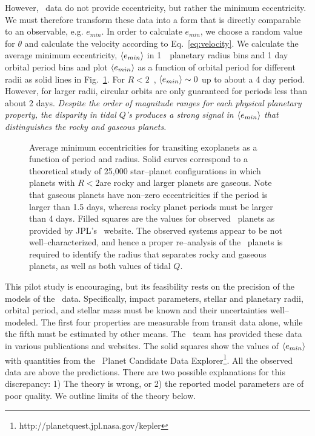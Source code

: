However, \kepler~data do not provide eccentricity, but rather the
minimum eccentricity. We must therefore transform these data into a
form that is directly comparable to an observable, e.g. $e_{min}$. In
order to calculate $e_{min}$, we choose a random value for $\theta$
and calculate the velocity according to Eq.~\ref{eq:velocity}. We
calculate the average minimum eccentricity, $\left< e_{min} \right>$ in
1~\rearth~planetary radius bins and 1 day orbital period bins and plot
$\left< e_{min} \right>$ as a function of orbital period for different radii as
solid lines in Fig.~\ref{fig:emin}. For $R < 2$~\rearth, $\left< e_{min} \right>
\sim 0$ up to about a 4 day period. However, for larger radii,
circular orbits are only guaranteed for periods less than about 2
days. \textit{Despite the order of magnitude ranges for each physical
  planetary property, the disparity in tidal $Q$'s produces a strong
  signal in $\left< e_{min} \right>$ that distinguishes the rocky and gaseous
  planets. }

\begin{figure}[h]
\centering
\begin{minipage}{2.7in}
\end{minipage}
\begin{minipage}{2.7in}
\caption{\label{fig:emin}Average minimum eccentricities for transiting
  exoplanets as a function of period and radius.  Solid curves
  correspond to a theoretical study of 25,000 star--planet
  configurations in which planets with $R < 2$\rearth are rocky and
  larger planets are gaseous.  Note that gaseous planets have
  non--zero eccentricities if the period is larger than 1.5 days,
  whereas rocky planet periods must be larger than 4 days.  Filled
  squares are the values for observed \kepler~planets as provided by
  JPL's \kepler~website.  The observed systems appear to be not
  well--characterized, and hence a proper re--analysis of the
  \kepler~planets is required to identify the radius that separates
  rocky and gaseous planets, as well as both values of tidal $Q$.}
\end{minipage}
\end{figure}

This pilot study is encouraging, but its feasibility rests on the
precision of the models of the \kepler~data.  Specifically, impact
parameters, stellar and planetary radii, orbital period, and stellar
mass must be known and their uncertainties well--modeled.  The first
four properties are measurable from transit data alone, while the
fifth must be estimated by other means.  The \kepler~team has provided
these data in various publications and websites.  The solid squares
show the values of $\left< e_{min} \right>$ with quantities from the
\kepler~Planet Candidate Data
Explorer\footnote{http://planetquest.jpl.nasa.gov/kepler}.  All the
observed data are above the predictions. There are two possible
explanations for this discrepancy: 1) The theory is wrong, or 2) the
reported model parameters are of poor quality.  We outline limits of
the theory below.

